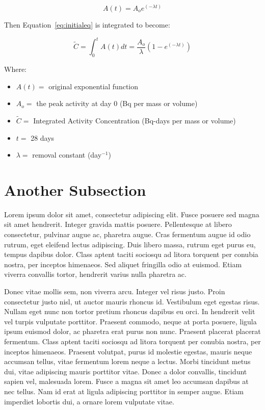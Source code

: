 \documentclass[double,12pt]{beavtex}
\begin{document}
\begin{equation}
A(t)=A_{o}e^{(-\lambda t)}
\label{eq:initialeq}
\end{equation}

Then Equation~\ref{eq:initialeq} is integrated to become:

\begin{equation}
\tilde{C}=\int_0^{t}A(t)dt = \frac{A_{o}}{\lambda} (1-e^{(-\lambda t)})
\label{eq:finaleq}
\end{equation}

Where:

\begin{itemize}
\item $A(t) =$ original exponential function
\item $A_{o} =$ the peak activity at day 0 (Bq per mass or volume)
\item $\tilde{C} =$ Integrated Activity Concentration (Bq-days per mass or volume)
\item $t =$ 28 days
\item $\lambda =$ removal constant (day$^{-1}$)
\end{itemize}



\section{Another Subsection}

Lorem ipsum dolor sit amet, consectetur adipiscing elit. Fusce posuere sed magna sit amet hendrerit. Integer gravida mattis posuere. Pellentesque at libero consectetur, pulvinar augue ac, pharetra augue. Cras fermentum augue id odio rutrum, eget eleifend lectus adipiscing. Duis libero massa, rutrum eget purus eu, tempus dapibus dolor. Class aptent taciti sociosqu ad litora torquent per conubia nostra, per inceptos himenaeos. Sed aliquet fringilla odio at euismod. Etiam viverra convallis tortor, hendrerit varius nulla pharetra ac. 

Donec vitae mollis sem, non viverra arcu. Integer vel risus justo. Proin consectetur justo nisl, ut auctor mauris rhoncus id. Vestibulum eget egestas risus. Nullam eget nunc non tortor pretium rhoncus dapibus eu orci. In hendrerit velit vel turpis vulputate porttitor. Praesent commodo, neque at porta posuere, ligula ipsum euismod dolor, ac pharetra erat purus non nunc. Praesent placerat placerat fermentum. Class aptent taciti sociosqu ad litora torquent per conubia nostra, per inceptos himenaeos. Praesent volutpat, purus id molestie egestas, mauris neque accumsan tellus, vitae fermentum lorem neque a lectus. Morbi tincidunt metus dui, vitae adipiscing mauris porttitor vitae. Donec a dolor convallis, tincidunt sapien vel, malesuada lorem. Fusce a magna sit amet leo accumsan dapibus at nec tellus. Nam id erat at ligula adipiscing porttitor in semper augue. Etiam imperdiet lobortis dui, a ornare lorem vulputate vitae. 
\end{document}
